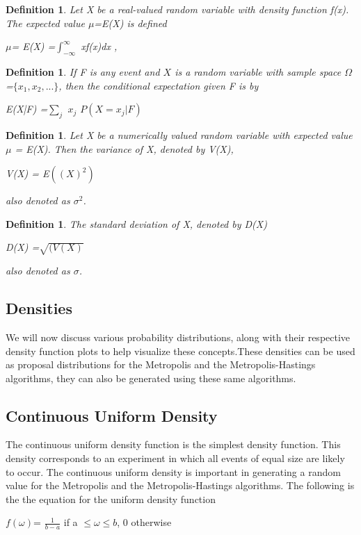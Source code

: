 \documentclass[11pt,a4paper]{article}
\theoremstyle{plain}
\newtheorem{de}[fact]{Definition}
\begin{document}
\begin{de}
 Let X be a real-valued random variable with density function f(x). The expected value $\mu$=E(X) is defined
 \begin{center}$\mu$= E(X) =$\displaystyle\int_{-\infty}^{\infty}$ xf(x)dx ,
 \end{center}
\end{de}

\begin{de}
 If F is any event and $X$ is a random variable with sample space $\Omega$=$\{ x_1,x_2,...\}$, then the conditional expectation given F is by 
 \begin{center}{E(X|F) =$\displaystyle\sum_j$ $x_j$ $P(X = x_j|F)$}
 \end{center}
\end{de}

\begin{de}Let X be a numerically valued random variable with expected value $\mu$ = E(X). Then the variance of X, denoted by V(X),
\begin{center}V(X) = E$((X)^2)$ 
\end{center}
also denoted as $\sigma^2$.
\end{de}

\begin{de}
The standard deviation of X, denoted by D(X)
\begin{center}D(X) =$\sqrt{(V(X)}$
\end{center}
also denoted as $\sigma$.
\end{de}


\subsection{\bf Densities}
We will now discuss various probability distributions, along with their respective density function plots to help visualize these concepts.These densities can be used as proposal distributions for the Metropolis and the Metropolis-Hastings algorithms, they can also be generated using these same algorithms.

\subsection*{Continuous Uniform Density}
The continuous uniform density function is the simplest density function. This density corresponds to an experiment in which all events of equal size are likely to occur. The continuous uniform density is important in generating a random value for the Metropolis and the Metropolis-Hastings algorithms. The following is the the equation for the uniform density function
\begin{center}
$f(\omega)$= $\frac{1}{b-a}$  {if a $\leq \omega \leq b$}, 0  otherwise
\end{center}
\end{document}
